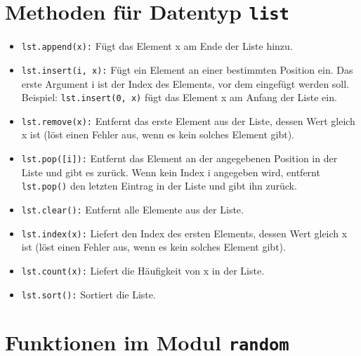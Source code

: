 \documentclass[11pt, oneside]{book}
\begin{document}
\section{Methoden für Datentyp \texttt{list}}

\begin{itemize}
    \item \texttt{lst.append(x):} Fügt das Element x am Ende der Liste hinzu.
    
    \item \texttt{lst.insert(i, x):} Fügt ein Element an einer bestimmten Position ein. Das erste Argument i ist der Index des Elements, vor dem eingefügt werden soll. Beispiel: \texttt{lst.insert(0, x)} fügt das Element x am Anfang der Liste ein.
    
    \item \texttt{lst.remove(x):} Entfernt das erste Element aus der Liste, dessen Wert gleich x ist (löst einen Fehler aus, wenn es kein solches Element gibt).
    
    \item \texttt{lst.pop([i]):} Entfernt das Element an der angegebenen Position in der Liste und gibt es zurück. Wenn kein Index i angegeben wird, entfernt \texttt{lst.pop()} den letzten Eintrag in der Liste und gibt ihn zurück.
    
    \item \texttt{lst.clear():} Entfernt alle Elemente aus der Liste.
    
    \item \texttt{lst.index(x):} Liefert den Index des ersten Elements, dessen Wert gleich x ist (löst einen Fehler aus, wenn es kein solches Element gibt).
    
    \item \texttt{lst.count(x):} Liefert die Häufigkeit von x in der Liste.
    
    \item \texttt{lst.sort():} Sortiert die Liste.
\end{itemize}

\section{Funktionen im Modul \texttt{random}}
\end{document}
